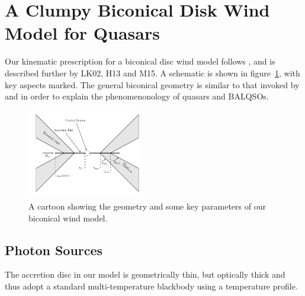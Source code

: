 \documentclass[preprint, a4paper, 11pt]{aastex}
\begin{document}




\section{A Clumpy Biconical Disk Wind Model for Quasars}

Our kinematic prescription for a biconical disc wind model
follows \cite{SV93}, and is described further by
LK02, H13 and M15. A schematic is shown in figure~\ref{fig:cartoon},
with key aspects marked. The general biconical
geometry is similar to that invoked by \cite{MCGV95} and 
\cite{elvis2000} in order to explain the phenomenonology
of quasars and BALQSOs.


\begin{figure} 
\centering
\includegraphics[width=0.45\textwidth]{figures/fig2_cartoon.png}
\caption
{
A cartoon showing the geometry and some key parameters of
our biconical wind model.
}
\label{fig:cartoon}
\end{figure} 





\subsection{Photon Sources}


The accretion disc in our model is geometrically thin, but optically thick
and thus adopt a standard multi-temperature blackbody
using a \cite{shakurasunyaev1973} temperature profile. 
\end{document}
